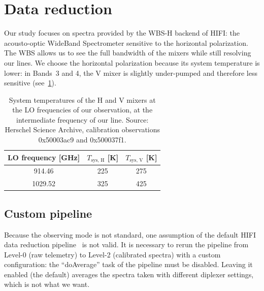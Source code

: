 \FloatBarrier
\section{Data reduction}
\label{sec:s140_data_reduction}
Our study focuses on spectra provided by the WBS-H backend of HIFI: the acousto-optic WideBand Spectrometer sensitive to the horizontal polarization.
The WBS allows us to see the full bandwidth of the mixers while still resolving our lines.
We choose the horizontal polarization because its system temperature is lower: in Bands~3 and 4, the V mixer is slightly under-pumped and therefore less sensitive (see~\cref{tab:chapter5_tsys}).

\begin{table}
    \centering
    \begin{tabular}{ccc}
        \toprule
        LO frequency [\si{\giga\hertz}] &
        $T_\text{sys, H}$ [\si{\kelvin}] &
        $T_\text{sys, V}$ [\si{\kelvin}]\\
        \midrule
        \num{914.46}   &   225   &   275 \\ %
        \num{1029.52}  &   325   &   425 \\ %
        \bottomrule
    \end{tabular}
    \caption{
        System temperatures of the H and V mixers at the LO frequencies of our observation, at the intermediate frequency of our line.
        Source: Herschel Science Archive, calibration observations 0x50003ac9
        and 0x500037f1.
    }
    \label{tab:chapter5_tsys}
\end{table}



\subsection{Custom pipeline}

Because the observing mode is not standard, one assumption of the default HIFI data reduction pipeline~\parencite{hifiobserversmanual} is not valid.
It is necessary to rerun the pipeline from Level-0 (raw telemetry) to Level-2 (calibrated spectra) with a custom configuration:
the ``doAverage'' task of the pipeline must be disabled.
Leaving it enabled (the default) averages the spectra taken with different diplexer settings, which is not what we want.



